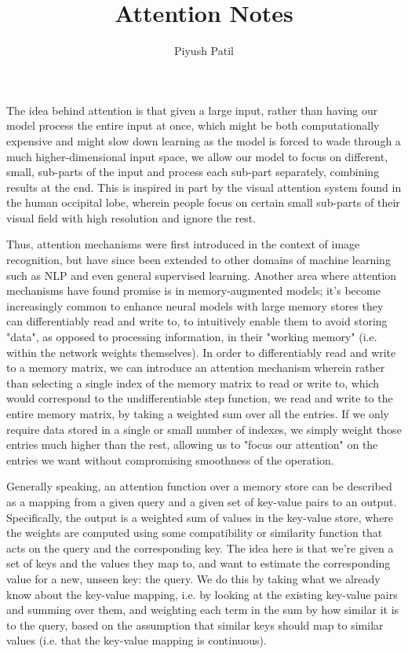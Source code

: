 \documentclass{article}
\begin{document}
\title{Attention Notes}
\author{Piyush Patil}
\maketitle

The idea behind attention is that given a large input, rather than having our model process the entire input at once, which might be both computationally expensive and might slow down learning as the model is forced to wade through a much higher-dimensional input space, we allow our model to focus on different, small, sub-parts of the input and process each sub-part separately, combining results at the end. This is inspired in part by the visual attention system found in the human occipital lobe, wherein people focus on certain small sub-parts of their visual field with high resolution and ignore the rest.

Thus, attention mechanisms were first introduced in the context of image recognition, but have since been extended to other domains of machine learning such as NLP and even general supervised learning. Another area where attention mechanisms have found promise is in memory-augmented models; it's become increasingly common to enhance neural models with large memory stores they can differentiably read and write to, to intuitively enable them to avoid storing "data", as opposed to processing information, in their "working memory" (i.e. within the network weights themselves). In order to differentiably read and write to a memory matrix, we can introduce an attention mechanism wherein rather than selecting a single index of the memory matrix to read or write to, which would correspond to the undifferentiable step function, we read and write to the entire memory matrix, by taking a weighted sum over all the entries. If we only require data stored in a single or small number of indexes, we simply weight those entries much higher than the rest, allowing us to "focus our attention" on the entries we want without compromising smoothness of the operation.

Generally speaking, an attention function over a memory store can be described as a mapping from a given query and a given set of key-value pairs to an output. Specifically, the output is a weighted sum of values in the key-value store, where the weights are computed using some compatibility or similarity function that acts on the query and the corresponding key. The idea here is that we're given a set of keys and the values they map to, and want to estimate the corresponding value for a new, unseen key: the query. We do this by taking what we already know about the key-value mapping, i.e. by looking at the existing key-value pairs and summing over them, and weighting each term in the sum by how similar it is to the query, based on the assumption that similar keys should map to similar values (i.e. that the key-value mapping is continuous).
\end{document}
